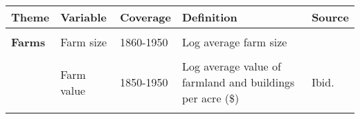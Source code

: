 \begin{tabular}{@{}l|llll@{}}
\hline\hline
\textbf{Theme}                     & \textbf{Variable}                                           & \textbf{Coverage}                     & \textbf{Definition}     & \textbf{Source}                            											     \\
\hline
                                   &                                                             &                                    &             &                                                                                                                                                                                                   \\                                                            
\textbf{Farms} 	      & Farm size          & 1860-1950                       & Log average farm size           & \citet{haines2010}                                                                                                                                                    \\                               
                                     &                                                             &                            &               &            \\     
		&  Farm value                                               &  1850-1950                           & Log average value of farmland and buildings per acre (\$)          & Ibid.             \\    
                                   &                                                             &                                 &             &                                                                                                                                                                                                   \\                                           

\end{tabular}
